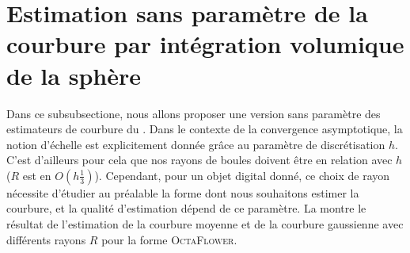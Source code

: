 \section{Estimation sans paramètre de la courbure par intégration volumique de la sphère}
%
Dans ce subsubsectione, nous allons proposer une version sans paramètre des
estimateurs de courbure du . Dans le contexte
de la convergence asymptotique, la notion d'échelle est explicitement donnée
grâce au paramètre de discrétisation $h$. C'est d'ailleurs pour cela que nos
rayons de boules doivent être en relation avec $h$ ($R$ est en
$O(h\frac{1}{3})$). Cependant, pour un objet digital donné, ce choix de rayon
nécessite d'étudier au préalable la forme dont nous souhaitons estimer la
courbure, et la qualité d'estimation dépend de ce paramètre. La
 montre le résultat de l'estimation de la
courbure moyenne et de la courbure gaussienne avec différents rayons $R$ pour la
forme \textsc{OctaFlower}.
%
